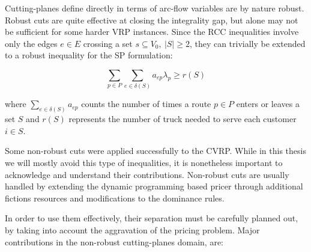 Cutting-planes define directly in terms of arc-flow variables are by nature
robust.
Robust cuts are quite effective at closing the integrality gap, but alone may not
be sufficient for some harder VRP instances.
Since the RCC inequalities involve only the edges $e \in E$ crossing a set $s \subseteq V_0,\ |S| \ge 2$,
they can trivially be extended to a robust inequality for the SP formulation:

\begin{equation}
	\sum_{p \in P} \sum_{e \in \delta(S)}  a_{ep} \lambda_p \ge r(S)
\end{equation}


where $\sum_{e \in \delta(S)} a_{ep}$ counts the number of times a route $p \in P$
enters or leaves a set $S$ and $r(S)$ represents the number of truck needed
to serve each customer $i \in S$.


\medskip

Some non-robust cuts were applied successfully to the CVRP.
While in this thesis we will mostly avoid this type of inequalities,
it is nonetheless important to acknowledge and understand their contributions.
Non-robust cuts are usually handled by extending the dynamic programming based pricer
through additional fictions resources and modifications to the dominance rules.

In order to use them effectively, their separation must be carefully
planned out, by taking into account the aggravation of the pricing problem.
Major contributions in the non-robust cutting-planes domain, are:

